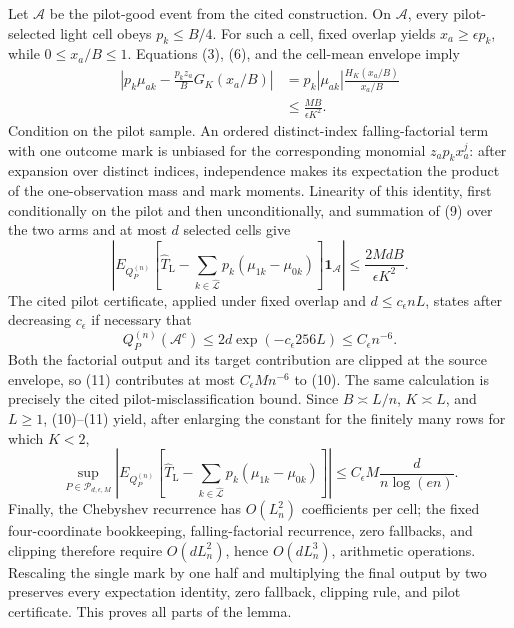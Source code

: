 Let \(\mathcal A\) be the pilot-good event from the cited construction.  On
\(\mathcal A\), every pilot-selected light cell obeys \(p_k\le B/4\).
For such a cell, fixed overlap yields \(x_a\ge\epsilon p_k\), while
\(0\le x_a/B\le1\).  Equations (3), (6), and the cell-mean envelope imply
\[
 \begin{split}
 \left|p_k\mu_{ak}-\frac{p_kz_a}{B}G_K(x_a/B)\right|
 &=p_k|\mu_{ak}|\frac{H_K(x_a/B)}{x_a/B}\\
 &\le \frac{MB}{\epsilon K^2}.
 \end{split}
\tag{9}
\]
Condition on the pilot sample.  An ordered distinct-index falling-factorial
term with one outcome mark is unbiased for the corresponding monomial
\(z_ap_kx_a^j\): after expansion over distinct indices, independence makes
its expectation the product of the one-observation mass and mark moments.
Linearity of this identity, first conditionally on the pilot and then
unconditionally, and summation of (9) over the two arms and at most \(d\)
selected cells give
\[
 \left|E_{Q_P^{(n)}}\!\left[
 \widehat T_{\mathrm L}
 -\sum_{k\in\widehat{\mathcal L}}
 p_k(\mu_{1k}-\mu_{0k})\right]\mathbf 1_{\mathcal A}\right|
 \le \frac{2MdB}{\epsilon K^2}.
\tag{10}
\]
The cited pilot certificate, applied under fixed overlap and
\(d\le c_\epsilon nL\), states after decreasing \(c_\epsilon\) if necessary
that
\[
 Q_P^{(n)}(\mathcal A^c)
 \le2d\exp(-c_\epsilon256L)\le C_\epsilon n^{-6}.
\tag{11}
\]
Both the factorial output and its target contribution are clipped at the
source envelope, so (11) contributes at most \(C_\epsilon Mn^{-6}\) to
(10).  The same calculation is precisely the cited pilot-misclassification
bound.  Since \(B\asymp L/n\), \(K\asymp L\), and \(L\ge1\), (10)--(11)
yield, after enlarging the constant for the finitely many rows for which
\(K<2\),
\[
 \sup_{P\in\mathcal P_{d,\epsilon,M}}
 \left|E_{Q_P^{(n)}}\!\left[
 \widehat T_{\mathrm L}
 -\sum_{k\in\widehat{\mathcal L}}
 p_k(\mu_{1k}-\mu_{0k})\right]\right|
 \le C_\epsilon M\frac{d}{n\log(en)}.
\tag{12}
\]
Finally, the Chebyshev recurrence has \(O(L_n^2)\) coefficients per cell;
the fixed four-coordinate bookkeeping, falling-factorial recurrence, zero
fallbacks, and clipping therefore require \(O(dL_n^2)\), hence
\(O(dL_n^3)\), arithmetic operations.  Rescaling the single mark by one half
and multiplying the final output by two preserves every expectation identity,
zero fallback, clipping rule, and pilot certificate.  This proves all parts
of the lemma.

